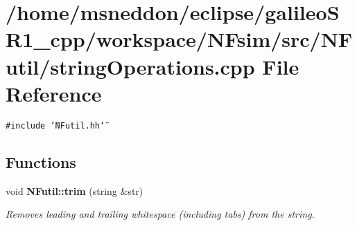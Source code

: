\section{/home/msneddon/eclipse/galileoSR1\_\-cpp/workspace/NFsim/src/NFutil/stringOperations.cpp File Reference}
\label{stringOperations_8cpp}


{\tt \#include \char`\"{}NFutil.hh\char`\"{}}\par
\subsection*{Functions}
\begin{CompactItemize}
\item 
void {\bf NFutil::trim} (string \&str)
\begin{CompactList}\small\item\em Removes leading and trailing whitespace (including tabs) from the string. \item\end{CompactList}\end{CompactItemize}
